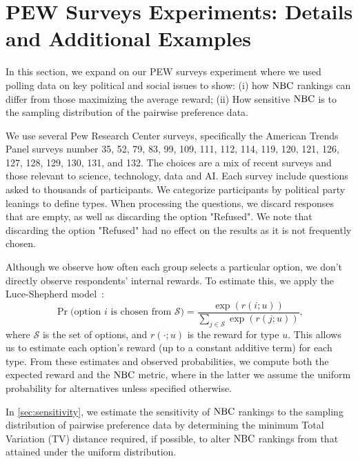 \section{PEW Surveys Experiments: Details and Additional Examples} \label{sec:pew_additional_examples} 
In this section, we expand on our PEW surveys experiment where we used polling data on key political and social issues to show: (i) how ${\rm NBC}$ rankings can differ from those maximizing the average reward; (ii) How sensitive ${\rm NBC}$ is to the sampling distribution of the pairwise preference data. 

 We use several Pew Research Center surveys, specifically the American Trends Panel surveys number 35, 52, 79, 83, 99,  109, 
111, 112,  114, 119, 120, 121, 126, 127, 128, 129, 130, 131, and 132. The choices are a mix of recent surveys and  those relevant to science, technology, data and AI. 
%
Each survey include questions asked to thousands of participants. We categorize participants by political party leanings to define types.
%
When processing the questions, we discard responses that are empty, as well as discarding the option "Refused". We note that discarding the option "Refused" had no effect on the results as it is not frequently chosen. 

Although we observe how often each group selects a particular option, we don't directly observe respondents' internal rewards. To estimate this, we apply the Luce-Shepherd model~\citep{shepard_stimulus_1957, luce1959individual}:
 \begin{equation}
 \label{eq:luce-shep}
        \Pr\big(\text{option } i \text{ is chosen from } \mathcal{S}\big) =  \frac{\exp{(r(i;u))}}{\sum_{{j\in \mathcal{S}}} \exp{(r(j;u))}},
\end{equation}
where $\mathcal{S}$ is the set of options, and $r(\cdot; u)$ is the reward for type $u$. 
This allows us to estimate each option's reward (up to a constant additive term) for each type. From these estimates and observed probabilities, we compute both the expected reward and the ${\rm NBC}$ metric, where in the latter we assume the uniform probability for alternatives unless specified otherwise.

 In \cref{sec:sensitivity}, we estimate the sensitivity of ${\rm NBC}$ rankings to the sampling distribution of pairwise preference data by determining the minimum Total Variation (TV) distance required, if possible, to alter ${\rm NBC}$ rankings from that attained under the uniform distribution.

